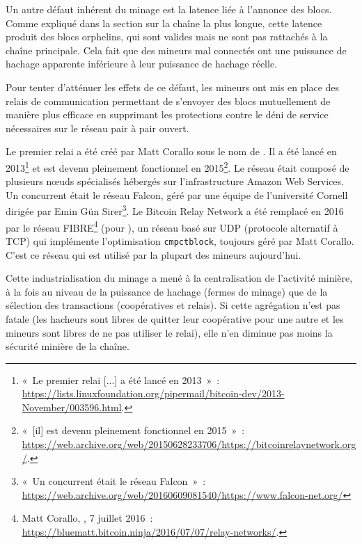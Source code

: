 
Un autre défaut inhérent du minage est la latence liée à l'annonce des blocs. Comme expliqué dans la section sur la chaîne la plus longue, cette latence produit des blocs orphelins, qui sont valides mais ne sont pas rattachés à la chaîne principale. Cela fait que des mineurs mal connectés ont une puissance de hachage apparente inférieure à leur puissance de hachage réelle.

Pour tenter d'atténuer les effets de ce défaut, les mineurs ont mis en place des relais de communication permettant de s'envoyer des blocs mutuellement de manière plus efficace en supprimant les protections contre le déni de service nécessaires sur le réseau pair à pair ouvert.

Le premier relai a été créé par Matt Corallo sous le nom de . Il a été lancé en 2013\footnote{«~Le premier relai [...] a été lancé en 2013~»~: \url{https://lists.linuxfoundation.org/pipermail/bitcoin-dev/2013-November/003596.html}.} et est devenu pleinement fonctionnel en 2015\footnote{«~[il] est devenu pleinement fonctionnel en 2015~»~: \url{https://web.archive.org/web/20150628233706/https://bitcoinrelaynetwork.org/}.}. Le réseau était composé de plusieurs nœuds spécialisés hébergés sur l'infrastructure Amazon Web Services. Un concurrent était le réseau Falcon, géré par une équipe de l'université Cornell dirigée par Emin Gün Sirer\footnote{«~Un concurrent était le réseau Falcon~»~: \url{https://web.archive.org/web/20160609081540/https://www.falcon-net.org/}}. Le Bitcoin Relay Network a été remplacé en 2016 par le réseau FIBRE\footnote{Matt Corallo, , 7 juillet 2016~: \url{https://bluematt.bitcoin.ninja/2016/07/07/relay-networks/}.} (pour ), un réseau basé sur UDP (protocole alternatif à TCP) qui implémente l'optimisation \texttt{cmpctblock}, toujours géré par Matt Corallo. C'est ce réseau qui est utilisé par la plupart des mineurs aujourd'hui.


Cette industrialisation du minage a mené à la centralisation de l'activité minière, à la fois au niveau de la puissance de hachage (fermes de minage) que de la sélection des transactions (coopératives et relais). Si cette agrégation n'est pas fatale (les hacheurs sont libres de quitter leur coopérative pour une autre et les mineurs sont libres de ne pas utiliser le relai), elle n'en diminue pas moins la sécurité minière de la chaîne.

